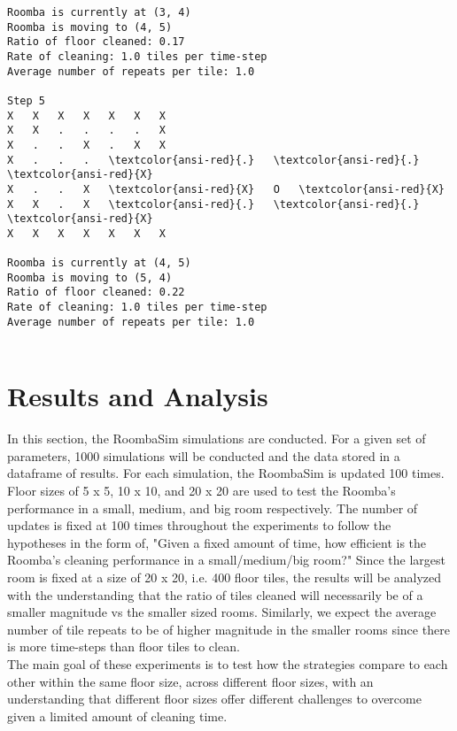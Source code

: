 \documentclass[11pt]{article}
\begin{document}
\begin{Verbatim}[commandchars=\\\{\},fontsize=\footnotesize]
Roomba is currently at (3, 4)
Roomba is moving to (4, 5)
Ratio of floor cleaned: 0.17
Rate of cleaning: 1.0 tiles per time-step
Average number of repeats per tile: 1.0

Step 5
X   X   X   X   X   X   X
X   X   .   .   .   .   X
X   .   .   X   .   X   X
X   .   .   .   \textcolor{ansi-red}{.}   \textcolor{ansi-red}{.}   \textcolor{ansi-red}{X}
X   .   .   X   \textcolor{ansi-red}{X}   O   \textcolor{ansi-red}{X}
X   X   .   X   \textcolor{ansi-red}{.}   \textcolor{ansi-red}{.}   \textcolor{ansi-red}{X}
X   X   X   X   X   X   X

Roomba is currently at (4, 5)
Roomba is moving to (5, 4)
Ratio of floor cleaned: 0.22
Rate of cleaning: 1.0 tiles per time-step
Average number of repeats per tile: 1.0


    \end{Verbatim}

    \section{Results and Analysis}

In this section, the RoombaSim simulations are conducted. For a given
set of parameters, 1000 simulations will be conducted and the data
stored in a dataframe of results. For each simulation, the RoombaSim is
updated 100 times.\\

Floor sizes of 5 x 5, 10 x 10, and 20 x 20 are used to test the Roomba's
performance in a small, medium, and big room respectively. The number of
updates is fixed at 100 times throughout the experiments to follow the
hypotheses in the form of, "Given a fixed amount of time, how efficient
is the Roomba's cleaning performance in a small/medium/big room?" Since
the largest room is fixed at a size of 20 x 20, i.e. 400 floor tiles,
the results will be analyzed with the understanding that the ratio of
tiles cleaned will necessarily be of a smaller magnitude vs the smaller
sized rooms. Similarly, we expect the average number of tile repeats to
be of higher magnitude in the smaller rooms since there is more
time-steps than floor tiles to clean. \\

The main goal of these experiments
is to test how the strategies compare to each other within the same
floor size, across different floor sizes, with an understanding that
different floor sizes offer different challenges to overcome given a
limited amount of cleaning time.
\end{document}
